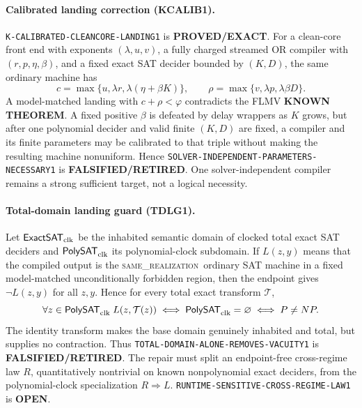 \documentclass[11pt]{article}
\newcommand{\same}{\textnormal{\textsc{same\_realization}}}
\begin{document}
\paragraph{Calibrated landing correction (KCALIB1).}
\texttt{K-CALIBRATED-CLEANCORE-LANDING1} is
\textbf{PROVED/EXACT}.  For a clean-core front end with exponents
\((\lambda,u,v)\), a fully charged streamed OR compiler with
\((r,p,\eta,\beta)\), and a fixed exact SAT decider bounded by
\((K,D)\), the same ordinary machine has
\[
 c=\max\{u,\lambda r,\lambda(\eta+\beta K)\},\qquad
 \rho=\max\{v,\lambda p,\lambda\beta D\}.
\]
A model-matched landing with \(c+\rho<\varphi\) contradicts the FLMV
\textbf{KNOWN THEOREM}.  A fixed positive \(\beta\) is defeated by delay
wrappers as \(K\) grows, but after one polynomial decider and valid finite
\((K,D)\) are fixed, a compiler and its finite parameters may be calibrated
to that triple without making the resulting machine nonuniform.  Hence
\texttt{SOLVER-INDEPENDENT-PARAMETERS-NECESSARY1} is
\textbf{FALSIFIED/RETIRED}.  One solver-independent compiler remains a strong
sufficient target, not a logical necessity.

\paragraph{Total-domain landing guard (TDLG1).}
Let \(\mathsf{ExactSAT}_{\rm clk}\) be the inhabited semantic domain of
clocked total exact SAT deciders and \(\mathsf{PolySAT}_{\rm clk}\) its
polynomial-clock subdomain.  If \(L(z,y)\) means that the compiled output is
the \same\ ordinary SAT machine in a fixed model-matched unconditionally
forbidden region, then the endpoint gives \(\neg L(z,y)\) for all \(z,y\).
Hence for every total exact transform \(\mathcal T\),
\[
 \forall z\in\mathsf{PolySAT}_{\rm clk}\;L(z,\mathcal T(z))
 \iff \mathsf{PolySAT}_{\rm clk}=\varnothing
 \iff P\ne NP .
\]
The identity transform makes the base domain genuinely inhabited and total,
but supplies no contraction.  Thus
\texttt{TOTAL-DOMAIN-ALONE-REMOVES-VACUITY1} is
\textbf{FALSIFIED/RETIRED}.  The repair must split an endpoint-free
cross-regime law \(R\), quantitatively nontrivial on known nonpolynomial exact
deciders, from the polynomial-clock specialization \(R\Rightarrow L\).
\texttt{RUNTIME-SENSITIVE-CROSS-REGIME-LAW1} is \textbf{OPEN}.
\end{document}
